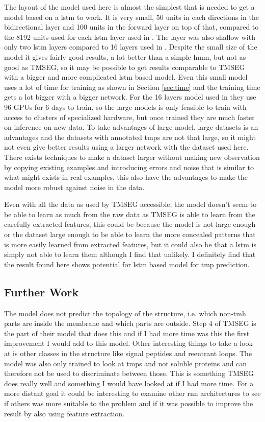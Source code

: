 The layout of the model used here is almost the simplest that is needed to
get a model based on a \gls{lstm} to work. It is very small, 50 units in each 
directions in the bidirectional layer and 100 units in the forward layer 
on top of that, compared to the 8192 units used for each \gls{lstm} layer 
used in \cite{JozefowiczEtAl}. The layer was also shallow with only
two \gls{lstm} layers compared to 16 layers used in \cite{WuEtAl}.
Despite the small size of the model it gives fairly good results,
a lot better than a simple \gls{hmm}, but not as good as TMSEG,
so it may be possible to get results comparable to TMSEG with a bigger and 
more complicated \gls{lstm} based model. Even this small model uses a lot of 
time for training as shown in Section \ref{sec:time} and the training time
gets a lot bigger with a bigger network. For the 16 layers model used in 
\cite{WuEtAl} they use 96 GPUs for 6 days to train, so the large models is 
only feasible to train with access to clusters of specialized hardware,
but once trained they are much faster on inference on new data.
To take advantages of large model, large datasets is an advantages
and the datasets with annotated \glspl{tmp} are not that large, 
so it might not even give better results using a larger network 
with the dataset used here. There exists techniques to make a dataset larger
without making new observation by copying existing examples and introducing 
errors and noise that is similar to what might exists in real examples,
this also have the advantages to make the model more robust against noise 
in the data. 

Even with all the data as used by TMSEG accessible, the model doesn't
seem to be able to learn as much from the raw data as TMSEG is able
to learn from the carefully extracted features, this could be because
the model is not large enough or the dataset large enough to be able to 
learn the more concealed patterns that is more easily learned from extracted
features, but it could also be that a \gls{lstm} is simply not able to learn 
them although I find that unlikely. I definitely find that the result found
here shows potential for \gls{lstm} based model for \gls{tmp} prediction.

\subsection{Further Work}
The model does not predict the topology of the structure, i.e. which 
non-\gls{tmh} parts are inside the membrane and which parts are outside.
Step 4 of TMSEG is the part of their model that does this and if I had more
time was this the first improvement I would add to this model.
Other interesting things to take a look at is other classes in the 
structure like signal peptides and reentrant loops. 
The model was also only trained to look at \glspl{tmp} and not 
soluble proteins and can therefore not be used to discriminate 
between those. This is something TMSEG does really well and 
something I would have looked at if I had more time.
For a more distant goal it could be interesting to examine other \gls{rnn}
architectures to see if others was more suitable to the problem and
if it was possible to improve the result by also using feature extraction.



